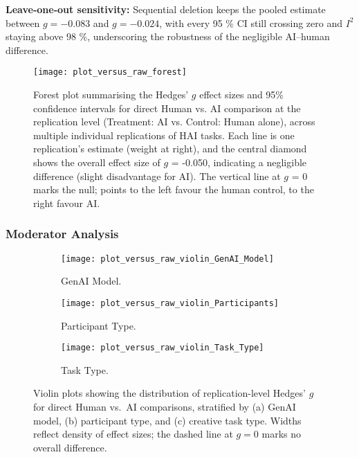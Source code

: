 \documentclass[manuscript, screen, review, acmsmall, anonymous]{acmart}
\begin{document}
\textbf{Leave‑one‑out sensitivity:} Sequential deletion keeps the pooled estimate between $g=-0.083$ and $g=-0.024$, with every 95 \% CI still crossing zero and $I^{2}$ staying above 98 \%, underscoring the robustness of the negligible AI–human difference. 
\begin{figure}[H]
  \centering
  \texttt{[image: plot\_versus\_raw\_forest]}
  \caption{Forest plot summarising the Hedges' $g$ effect sizes and 95\% confidence intervals for direct Human vs. AI comparison at the replication level (Treatment: AI vs. Control: Human alone), across multiple individual replications of HAI tasks. Each line is one replication's estimate (weight at right), and the central diamond shows the overall effect size of $g$ = -0.050, indicating a negligible difference (slight disadvantage for AI). The vertical line at $g$ = 0 marks the null; points to the left favour the human control, to the right favour AI.}
  \label{fig:versus_raw_forest}
\end{figure}
\newpage
\subsubsection{Moderator Analysis}
\label{sec:CreativePerformanceComparisonOfHumanAndAI_Moderator}

\begin{figure}[h]
  \centering
  \begin{subfigure}[t]{0.33\linewidth}
    \centering
    \texttt{[image: plot\_versus\_raw\_violin\_GenAI\_Model]}
    \caption{GenAI Model.}
    \label{fig:versus_violin_genai_model}
  \end{subfigure}\hfill
  \begin{subfigure}[t]{0.33\linewidth}
    \centering
    \texttt{[image: plot\_versus\_raw\_violin\_Participants]}
    \caption{Participant Type.}
    \label{fig:versus_violin_participants}
  \end{subfigure}\hfill
  \begin{subfigure}[t]{0.33\linewidth}
    \centering
    \texttt{[image: plot\_versus\_raw\_violin\_Task\_Type]}
    \caption{Task Type.}
    \label{fig:versus_violin_task_type}
  \end{subfigure}
  \caption{Violin plots showing the distribution of replication-level Hedges' \(g\) for direct Human vs.\ AI comparisons, stratified by (a) GenAI model, (b) participant type, and (c) creative task type. Widths reflect density of effect sizes; the dashed line at \(g=0\) marks no overall difference.}
  \label{fig:versus_raw_violins}
\end{figure}
\end{document}
